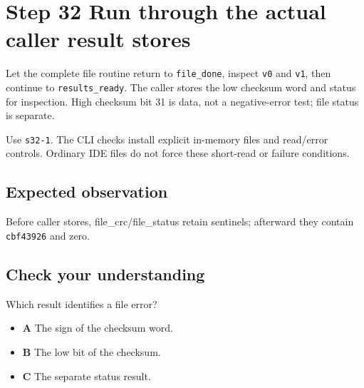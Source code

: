 \section{Step 32 Run through the actual caller result stores}\label{crc-s32}

Let the complete file routine return to \texttt{file\_done}, inspect \texttt{v0} and \texttt{v1}, then continue to \texttt{results\_ready}. The caller stores the low checksum word and status for inspection. High checksum bit 31 is data, not a negative-error test; file status is separate.

Use \texttt{s32-1}. The CLI checks install explicit in-memory files and read/error controls. Ordinary IDE files do not force these short-read or failure conditions.

\subsection{Expected observation}
Before caller stores, file\_crc/file\_status retain sentinels; afterward they contain \texttt{cbf43926} and zero.

\subsection{Check your understanding}
Which result identifies a file error?

\begin{itemize}
\item \textbf{A} The sign of the checksum word.
\item \textbf{B} The low bit of the checksum.
\item \textbf{C} The separate status result.
\end{itemize}
